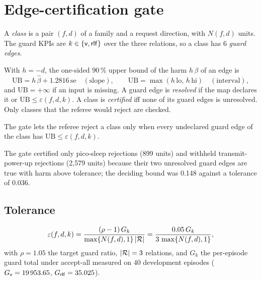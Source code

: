 \section{Edge-certification gate}
\label{spec:gate}

A \emph{class} is a pair $(f, d)$ of a family and a request direction, with $N(f, d)$ units. The guard KPIs are $k \in \{\mathsf{v}, \mathsf{rlf}\}$ over the three relations, so a class has $6$ \emph{guard edges}.

\begin{definition}
With $h = -d$, the one-sided $90\,\%$ upper bound of the harm $h\,\beta$ of an edge is
\begin{equation*}
\mathrm{UB} = h\,\hat\beta + 1.2816\,\mathrm{se} \quad (\text{slope}), \qquad
\mathrm{UB} = \max(h\,\mathrm{lo},\, h\,\mathrm{hi}) \quad (\text{interval}),
\end{equation*}
and $\mathrm{UB} = +\infty$ if an input is missing. A guard edge is \emph{resolved} if the map declares it or $\mathrm{UB} \le \varepsilon(f, d, k)$. A class is \emph{certified} iff none of its guard edges is unresolved. Only classes that the referee would reject are checked.
\end{definition}

\noindent The gate lets the referee reject a class only when every undeclared guard edge of the class has $\mathrm{UB} \le \varepsilon(f, d, k)$.


The gate certified only pico-sleep rejections (899 units) and withheld transmit-power-up rejections (2,579 units) because their two unresolved guard edges are true with harm above tolerance; the deciding bound was 0.148 against a tolerance of 0.036.

\subsection{Tolerance}
\label{spec:gate.tol}

\begin{equation*}
\varepsilon(f, d, k) = \frac{(\rho - 1)\, G_k}{\max\{N(f, d), 1\}\,\lvert \mathcal{R}\rvert} = \frac{0.05\, G_k}{3\,\max\{N(f, d), 1\}},
\end{equation*}
with $\rho = 1.05$ the target guard ratio, $\lvert \mathcal{R}\rvert = 3$ relations, and $G_k$ the per-episode guard total under accept-all measured on $40$ development episodes ($G_{\mathsf{v}} = 19\,953.65$, $G_{\mathsf{rlf}} = 35.025$).

